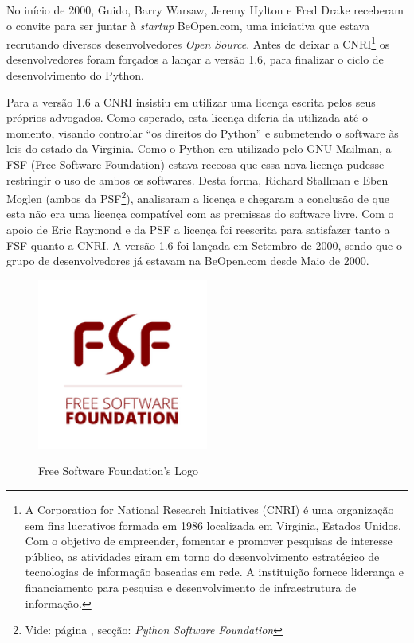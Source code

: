 No início de 2000, Guido, Barry Warsaw, Jeremy Hylton e Fred Drake receberam o convite para ser juntar à \textit{startup} BeOpen.com, uma iniciativa que estava recrutando diversos desenvolvedores \textit{Open Source}.
Antes de deixar a CNRI\footnote{
    A Corporation for National Research Initiatives (CNRI) é uma organização sem fins lucrativos formada em 1986 localizada em Virginia, Estados Unidos.
    Com o objetivo de empreender, fomentar e promover pesquisas de interesse público, as atividades giram em torno do desenvolvimento estratégico de tecnologias de informação baseadas em rede.
    A instituição fornece liderança e financiamento para pesquisa e desenvolvimento de infraestrutura de informação.
} os desenvolvedores foram forçados a lançar a versão 1.6, para finalizar o ciclo de desenvolvimento do Python.

Para a versão 1.6 a CNRI insistiu em utilizar uma licença escrita pelos seus próprios advogados.
Como esperado, esta licença diferia da utilizada até o momento, visando controlar “os direitos do Python” e submetendo o software às leis do estado da Virginia.
Como o Python era utilizado pelo GNU Mailman, a FSF (Free Software Foundation) estava receosa que essa nova licença pudesse restringir o uso de ambos os softwares. 
Desta forma, Richard Stallman e Eben Moglen (ambos da PSF\footnote{
    Vide: página \pageref{sec:python-software-foundation}, secção: \textit{Python Software Foundation}
}), analisaram a licença e chegaram a conclusão de que esta não era uma licença compatível com as premissas do software livre.
Com o apoio de Eric Raymond e da PSF a licença foi reescrita para satisfazer tanto a FSF quanto a CNRI.
A versão 1.6 foi lançada em Setembro de 2000, sendo que o grupo de desenvolvedores já estavam na BeOpen.com desde Maio de 2000.
\begin{figure}[!htb]
    \centering
    \caption{Free Software Foundation's Logo}
    \includegraphics[width=0.5\textwidth]{./dados/figuras/FSF.png}
    \label{fig:figura-fsf}
\end{figure}

